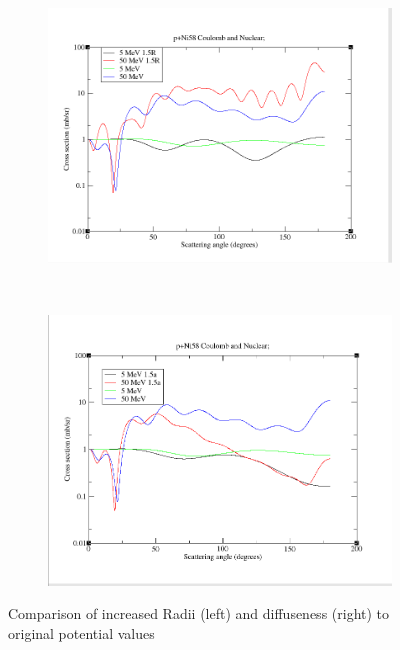 \documentclass[paper=a4, fontsize=11pt]{scrartcl} %
\numberwithin{equation}{section} %
\numberwithin{figure}{section} %
\numberwithin{table}{section} %
\begin{document}
 \begin{figure}[hbt]
        \centering
        \begin{subfigure}[b!]{0.5\textwidth}
                \includegraphics[width=\textwidth]{ChangedRadius.PNG}
        \end{subfigure}%
        ~ %
\quad
        \begin{subfigure}[b!]{0.5\textwidth}
                \includegraphics[width=\textwidth]{ChangedDiff.PNG}
        \end{subfigure}

        \caption{Comparison of increased Radii (left) and diffuseness (right) to original potential values}
\end{figure}
\end{document}
